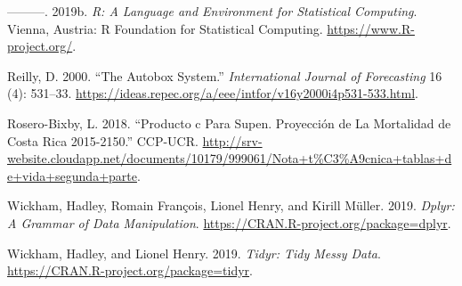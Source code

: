 \documentclass[]{article}
\begin{document}
\leavevmode\hypertarget{ref-parallel}{}%
---------. 2019b. \emph{R: A Language and Environment for Statistical
Computing}. Vienna, Austria: R Foundation for Statistical Computing.
\url{https://www.R-project.org/}.

\leavevmode\hypertarget{ref-autobox}{}%
Reilly, D. 2000. ``The Autobox System.'' \emph{International Journal of
Forecasting} 16 (4): 531--33.
\url{https://ideas.repec.org/a/eee/intfor/v16y2000i4p531-533.html}.

\leavevmode\hypertarget{ref-supenprodc}{}%
Rosero-Bixby, L. 2018. ``Producto c Para Supen. Proyección de La
Mortalidad de Costa Rica 2015-2150.'' CCP-UCR.
\url{http://srv-website.cloudapp.net/documents/10179/999061/Nota+t\%C3\%A9cnica+tablas+de+vida+segunda+parte}.

\leavevmode\hypertarget{ref-dplyr}{}%
Wickham, Hadley, Romain François, Lionel Henry, and Kirill Müller. 2019.
\emph{Dplyr: A Grammar of Data Manipulation}.
\url{https://CRAN.R-project.org/package=dplyr}.

\leavevmode\hypertarget{ref-tidyr}{}%
Wickham, Hadley, and Lionel Henry. 2019. \emph{Tidyr: Tidy Messy Data}.
\url{https://CRAN.R-project.org/package=tidyr}.
\end{document}
